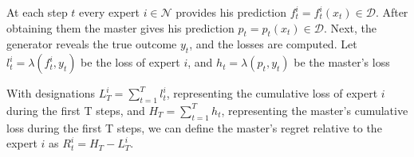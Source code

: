 \documentclass[12pt, twoside]{article}
\begin{document}
At each step $t$ every expert $i \in \mathcal{N}$ provides his prediction $f_t^i = f_t^i(x_t)  \in \mathcal{D}$. 
After obtaining them the master gives his prediction $p_t = p_t(x_t) \in \mathcal{D}$. 
Next, the generator reveals the true outcome $y_t$, and the losses are computed.
Let $l_t^i = \lambda(f_t^i, y_t)$ be the loss of expert $i$, and $h_t = \lambda(p_t, y_t)$ be the master's loss 

With designations $L_T^i = \sum_{t = 1}^T l_t^i$, representing the cumulative loss of expert $i$ during the first T steps, and $H_T = \sum_{t = 1}^T h_t$, 
representing the master's cumulative loss during the first T steps, we can define the master's regret relative to the expert $i$ as $R^i_t = H_T - L^i_T$. 

 
\vspace{5mm}
\end{document}
